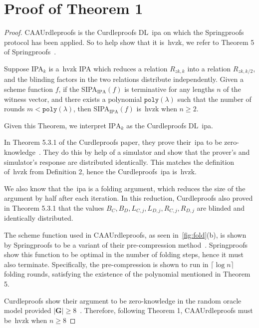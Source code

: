
\section{Proof of Theorem 1}\label{sec:appendix-thm1proof}
\begin{proof}
    CAAUrdleproofs is the Curdleproofs DL~\gls{ipa} on which the Springproofs protocol has been applied.
    So to help show that it is~\gls{hvzk}, we refer to Theorem 5 of Springproofs~\cite{zhang2024springproofs}.
    \begin{theorem}
        Suppose IPA$_k$ is a~\gls{hvzk} IPA which reduces a relation $R_{zk,k}$ into a relation $R_{zk,k/2}$, and the blinding factors in the two relations distribute independently.
        Given a scheme function $f$, if the SIPA$_{\text{IPA}}(f)$ is terminative for any lengths $n$ of the witness vector, and there exists a polynomial $\texttt{poly}(\lambda)$ such that the number of rounds $m<\texttt{poly}(\lambda)$, then SIPA$_{\text{IPA}}(f)$ is~\gls{hvzk} when $n\geq2$.
    \end{theorem}
    Given this Theorem, we interpret $\text{IPA}_k$ as the Curdleproofs DL~\gls{ipa}.

    In Theorem 5.3.1 of the Curdleproofs paper, they prove their~\gls{ipa} to be zero-knowledge~\cite{Curdleproofs}.
    They do this by help of a simulator and show that the prover's and simulator's response are distributed identically.
    This matches the definition of~\gls{hvzk} from Definition 2, hence the Curdleproofs~\gls{ipa} is~\gls{hvzk}.

    We also know that the~\gls{ipa} is a folding argument, which reduces the size of the argument by half after each iteration.
    In this reduction, Curdleproofs also proved in Theorem 5.3.1 that the values $B_C,B_D,L_{C,j},L_{D,j},R_{C,j},R_{D,j}$ are blinded and identically distributed.

    The scheme function used in CAAUrdleproofs, as seen in~\autoref{fig:fold}(b), is shown by Springproofs to be a variant of their pre-compression method~\cite{zhang2024springproofs}.
    Springproofs show this function to be optimal in the number of folding steps, hence it must also terminate.
    Specifically, the pre-compression is shown to run in $\lceil \log n\rceil$ folding rounds, satisfying the existence of the polynomial mentioned in Theorem 5.

    Curdleproofs show their argument to be zero-knowledge in the random oracle model provided $|\mathbf{G}|\geq8$~\cite{Curdleproofs}.
    Therefore, following Theorem 1, CAAUrdleproofs must be~\gls{hvzk} when $n\geq8$


\end{proof}
